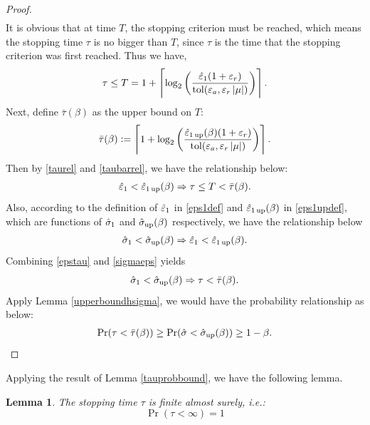 \documentclass{iitthesis}
\newtheorem{lemma}[theorem]{Lemma}
\theoremstyle{definition}
\begin{document}
\begin{proof}
\begin{align}
\end{align}
It is obvious that at time $T$, the stopping criterion must be reached, which means the stopping time $\tau$ is no bigger than $T$, since $\tau$ is the time that the stopping criterion was first reached. Thus we have,
\begin{align}\label{taurel}
\tau \le T=1+\left \lceil \log_{2} \left(\frac{\hat{\varepsilon}_{1}(1+\varepsilon_r)}{ \operatorname{tol}(\varepsilon_a,\varepsilon_r \left \lvert \mu \right \rvert)}\right) \right \rceil.
\end{align}
Next, define $\bar{\tau}(\beta)$ as the upper bound on $T$:
\begin{align}\label{taubarrel}
\bar{\tau}(\beta):= \left \lceil 1+\log_2 \left(\frac{\hat{\varepsilon}_{1\operatorname{up}}(\beta)(1+\varepsilon_r)}{ \operatorname{tol}(\varepsilon_a,\varepsilon_r \left \lvert \mu \right \rvert)}\right) \right \rceil.
\end{align}
Then by \eqref{taurel} and \eqref{taubarrel}, we have the relationship below:
\begin{align} \label{epstau}
 \hat{\varepsilon}_1 <\hat{\varepsilon}_{1\operatorname{up}}(\beta) \Rightarrow \tau \le T<\bar{\tau}(\beta).
\end{align}
Also, according to the definition of $\hat{\varepsilon}_1$ in \eqref{eps1def} and $\hat{\varepsilon}_{1\operatorname{up}}(\beta)$ in \eqref{eps1updef}, which are functions of $\hat{\sigma}_1$ and $\hat{\sigma}_{\operatorname{up}}(\beta)$ respectively, we have the relationship below
\begin{align}\label{sigmaeps}
 \hat{\sigma}_1 < \hat{\sigma}_{\operatorname{up}}(\beta) \Rightarrow \hat{\varepsilon}_1 < \hat{\varepsilon}_{1\operatorname{up}}(\beta).
\end{align}
Combining \eqref{epstau} and \eqref{sigmaeps} yields
$$\hat{\sigma}_1 < \hat{\sigma}_{\operatorname{up}}(\beta) \Rightarrow\tau <\bar{\tau}(\beta).$$
Apply Lemma \ref{upperboundhsigma}, we would have the probability relationship as below: 
\begin{align}
\Pr(\tau < \bar{\tau}(\beta)) \geq  \Pr(\hat{\sigma} < \hat{\sigma}_{\operatorname{up}}(\beta)) \geq 1-\beta.
\end{align}
\end{proof}
Applying the result of Lemma \ref{tauprobbound}, we have the following lemma.
\begin{lemma}\label{taufinite}
The stopping time $\tau$ is finite almost surely, i.e.:
$$\Pr(\tau < \infty) = 1$$
\end{lemma}
\end{document}
